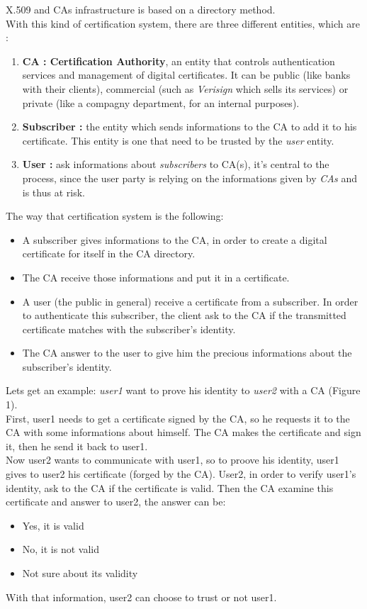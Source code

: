 \documentclass[journal, a4paper]{IEEEtran}
\begin{document}
X.509 and CAs\cite{rfc3647} infrastructure is based on a directory method.\\
With this kind of certification system, there are three different entities, which are :

\begin{enumerate}
	\item \textbf{CA : Certification Authority}, an entity that controls authentication services and management of digital certificates. It can be public (like banks with their clients), commercial (such as \textit{Verisign} which sells its services) or private (like a compagny department, for an internal purposes).
	\item \textbf{Subscriber :} the entity which sends informations to the CA to add it to his certificate. This entity is one that need to be trusted by the \textit{user} entity.
	\item \textbf{User :} ask informations about \textit{subscribers} to CA(s), it's central to the process, since the user party is relying on the informations given by \textit{CAs} and is thus at risk.
\end{enumerate}

The way that certification system is the following:
\begin{itemize}
	\item A subscriber gives informations to the CA, in order to create a digital certificate for itself in the CA directory.
	\item The CA receive those informations and put it in a certificate.
	\item A user (the public in general) receive a certificate from a subscriber. In order to authenticate this subscriber, the client ask to the CA if the transmitted certificate matches with the subscriber's identity.
	\item The CA answer to the user to give him the precious informations about the subscriber's identity.
\end{itemize}

Lets get an example: \textit{user1} want to prove his identity to \textit{user2} with a CA (Figure 1).\\
First, user1 needs to get a certificate signed by the CA, so he requests it to the CA with some informations about himself. The CA makes the certificate and sign it, then he send it back to user1.\\
Now user2 wants to communicate with user1, so to proove his identity, user1 gives to user2 his certificate (forged by the CA). User2, in order to verify user1's identity, ask to the CA if the certificate is valid. Then the CA examine this certificate and answer to user2, the answer can be:
\begin{itemize}
	\item Yes, it is valid
	\item No, it is not valid
	\item Not sure about its validity
\end{itemize}
With that information, user2 can choose to trust or not user1.
\end{document}

